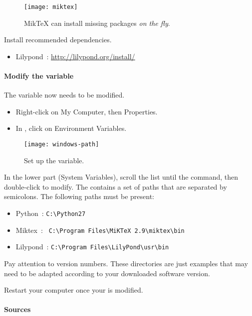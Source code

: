 \begin{figure}
  \centering
  \texttt{[image: miktex]}
  \caption{MikTeX can install missing packages \emph{on the fly}.}
  \label{fig:miktex}
\end{figure}

Install recommended dependencies.
\begin{itemize} 
\item Lilypond~: \url{http://lilypond.org/install/}
\end{itemize}


\paragraph{Modify the  variable}

The  variable now needs to be modified.
\begin{itemize}
\item Right-click on My Computer, then Properties.
\item In , click on Environment
  Variables.
\end{itemize}

\begin{figure}
  \centering
  \texttt{[image: windows-path]}
  \caption{Set up the  variable.}
  \label{fig:windows-path}
\end{figure}

In the lower part (System Variables), scroll the list until the
 command, then double-click to modify. The 
contains a set of paths that are separated by semicolons. The
following paths must be present:
\begin{itemize}
\item Python~: \verb#C:\Python27#
\item Miktex~: \verb# C:\Program Files\MiKTeX 2.9\miktex\bin#
\item Lilypond~: \verb#C:\Program Files\LilyPond\usr\bin#
\end{itemize}

\begin{nota}
Pay attention to version numbers. These directories are just examples
that may need to be adapted according to your downloaded software
version.
\end{nota}

Restart your computer once your  is modified.

\paragraph{Sources}

